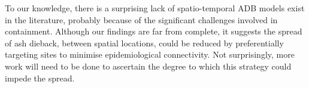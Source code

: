 





To our knowledge, there is a surprising lack of spatio-temporal ADB models exist in the literature, probably because of the significant challenges involved in containment. Although our findings are far from complete, it suggests the spread of ash dieback, between spatial locations, could be reduced by preferentially targeting sites to minimise epidemiological connectivity. Not surprisingly, more work will need to be done to ascertain the degree to which this strategy could impede the spread. 



